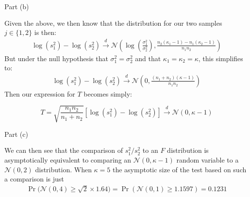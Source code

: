 \begin{frame}{Part (b)}

    Given the above, we then know that the distribution for our two samples $j \in \{1, 2 \}$ is then:
    \begin{align*}
        \log(s^2_1) - \log(s^2_2) \xrightarrow{d} \mathcal{N} \left(\log \left( \frac{\sigma^2_1}{\sigma^2_2} \right), \frac{n_2(\kappa_1 - 1) - n_1(\kappa_2 - 1) }{n_1  n_2} \right)
    \end{align*}
    But under the null hypothesis that $\sigma_1^2 = \sigma_2^2$ and that $\kappa_1 = \kappa_2 = \kappa$, this simplifies to:
    \begin{align*}
        \log(s^2_1) - \log(s^2_2) \xrightarrow{d} \mathcal{N} \left(0, \frac{(n_1 + n_2)(\kappa - 1)}{n_1  n_2} \right)
    \end{align*}
    Then our expression for $T$ becomes simply:
      
    \begin{equation*} 
        T = \sqrt{\frac{n_1 n_2}{n_1 + n_2}} \left[ \log \left( s_1^2\right) - \log \left( s_2^2\right) \right]\xrightarrow{d} \mathcal{N} (0, \kappa - 1)        
    \end{equation*}
    
\end{frame}

\begin{frame}{Part (c)}
    
    We can then see that the comparison of $s_1^2 / s_2^2$ to an $F$ distribution is asymptotically equivalent to comparing an $\mathcal{N}(0, \kappa - 1)$ random variable to a $\mathcal{N}(0, 2)$ distribution. When $\kappa = 5$ the asymptotic size of the test based on such a comparison is just
    \begin{align*}
        \operatorname{Pr}( \mathcal{N}(0, 4) \geq \sqrt{2} \times 1.64 \Biggr) = \operatorname{Pr} ( \mathcal{N}(0, 1) \geq 1.1597) = 0.1231
    \end{align*}
    
\end{frame}

